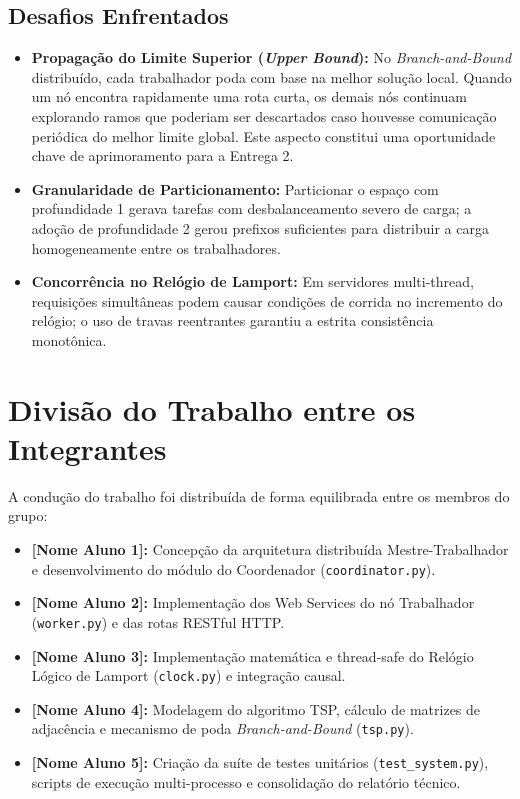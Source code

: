 \documentclass[12pt]{article}
\begin{document}
\subsection{Desafios Enfrentados}
\begin{itemize}
    \item \textbf{Propagação do Limite Superior (\textit{Upper Bound}):} No \textit{Branch-and-Bound} distribuído, cada trabalhador poda com base na melhor solução local. Quando um nó encontra rapidamente uma rota curta, os demais nós continuam explorando ramos que poderiam ser descartados caso houvesse comunicação periódica do melhor limite global. Este aspecto constitui uma oportunidade chave de aprimoramento para a Entrega 2.
    \item \textbf{Granularidade de Particionamento:} Particionar o espaço com profundidade 1 gerava tarefas com desbalanceamento severo de carga; a adoção de profundidade 2 gerou prefixos suficientes para distribuir a carga homogeneamente entre os trabalhadores.
    \item \textbf{Concorrência no Relógio de Lamport:} Em servidores multi-thread, requisições simultâneas podem causar condições de corrida no incremento do relógio; o uso de travas reentrantes garantiu a estrita consistência monotônica.
\end{itemize}

\section{Divisão do Trabalho entre os Integrantes}
A condução do trabalho foi distribuída de forma equilibrada entre os membros do grupo:
\begin{itemize}
    \item \textbf{[Nome Aluno 1]:} Concepção da arquitetura distribuída Mestre-Trabalhador e desenvolvimento do módulo do Coordenador (\texttt{coordinator.py}).
    \item \textbf{[Nome Aluno 2]:} Implementação dos Web Services do nó Trabalhador (\texttt{worker.py}) e das rotas RESTful HTTP.
    \item \textbf{[Nome Aluno 3]:} Implementação matemática e thread-safe do Relógio Lógico de Lamport (\texttt{clock.py}) e integração causal.
    \item \textbf{[Nome Aluno 4]:} Modelagem do algoritmo TSP, cálculo de matrizes de adjacência e mecanismo de poda \textit{Branch-and-Bound} (\texttt{tsp.py}).
    \item \textbf{[Nome Aluno 5]:} Criação da suíte de testes unitários (\texttt{test\_system.py}), scripts de execução multi-processo e consolidação do relatório técnico.
\end{itemize}
\end{document}
